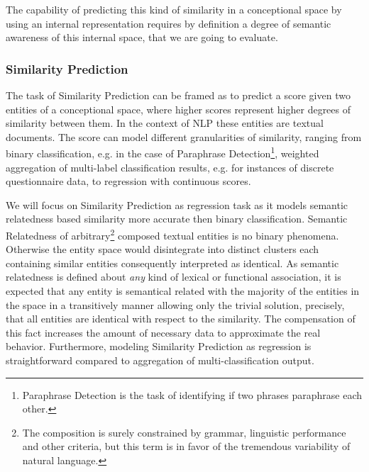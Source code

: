 The capability of predicting this kind of similarity in a conceptional space by using an internal representation requires by definition a degree of semantic awareness of this internal space, that we are going to evaluate.



\subsubsection{Similarity Prediction}
The task of Similarity Prediction can be framed as to predict a score given two entities of a conceptional space, where higher scores represent higher degrees of similarity between them. In the context of \ac{NLP} these entities are textual documents. The score can model different granularities of similarity, ranging from binary classification, e.g. in the case of Paraphrase Detection\footnote{Paraphrase Detection is the task of identifying if two phrases paraphrase each other.}, weighted aggregation of multi-label classification results, e.g. for instances of discrete %
questionnaire data, to regression with continuous scores. 

We will focus on Similarity Prediction as regression task as it models semantic relatedness based similarity more accurate then binary classification. Semantic Relatedness of arbitrary\footnote{The composition is surely constrained by grammar, linguistic performance and other criteria, but this term is in favor of the tremendous variability of natural language.} composed textual entities is no binary phenomena. Otherwise the entity space would disintegrate into distinct clusters each containing similar entities consequently interpreted as identical. As semantic relatedness is defined about \textit{any} kind of lexical or functional association, it is expected that any entity is semantical related with the majority of the entities in the space in a transitively manner allowing only the trivial solution, precisely, that all entities are identical with respect to the similarity.
The compensation of this fact increases the amount of necessary data to approximate the real behavior. Furthermore, modeling Similarity Prediction as regression is straightforward compared to aggregation of multi-classification output.  

